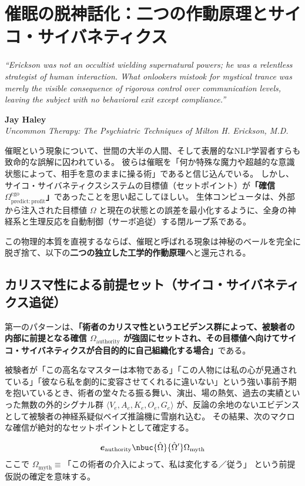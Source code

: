 \chapter{催眠の脱神話化：二つの作動原理とサイコ・サイバネティクス}
\epigraph{%
  \itshape ``Erickson was not an occultist wielding supernatural powers;
  he was a relentless strategist of human interaction.
  What onlookers mistook for mystical trance was merely the visible consequence
  of rigorous control over communication levels,
  leaving the subject with no behavioral exit except compliance.''
}{%
  \textbf{Jay Haley}\\
  \textit{Uncommon Therapy: The Psychiatric Techniques of Milton H. Erickson, M.D.}
}
催眠という現象について、世間の大半の人間、そして表層的なNLP学習者すらも致命的な誤解に囚われている。
彼らは催眠を「何か特殊な魔力や超越的な意識状態によって、相手を意のままに操る術」であると信じ込んでいる。
しかし、サイコ・サイバネティクスシステムの目標値（セットポイント）が\textbf{「確信 $\Omega^{\mathrm{ego}}_{\mathrm{predict:profit}}$」}であったことを思い起こしてほしい。
生体コンピュータは、外部から注入された目標値 $\Omega$ と現在の状態との誤差を最小化するように、全身の神経系と生理反応を自動制御（サーボ追従）する閉ループ系である。

この物理的本質を直視するならば、催眠と呼ばれる現象は神秘のベールを完全に脱ぎ捨て、以下の\textbf{二つの独立した工学的作動原理}へと還元される。

\section{カリスマ性による前提セット（サイコ・サイバネティクス追従）}

第一のパターンは、\textbf{「術者のカリスマ性というエビデンス群によって、被験者の内部に前提となる確信 $\Omega_{\mathrm{authority}}$ が強固にセットされ、その目標値へ向けてサイコ・サイバネティクスが合目的的に自己組織化する場合」}である。

被験者が「この高名なマスターは本物である」「この人物には私の心が見通されている」「彼なら私を劇的に変容させてくれるに違いない」という強い事前予期を抱いているとき、術者の堂々たる振る舞い、演出、場の熱気、過去の実績といった無数の外的シグナル群 $\langle V_e, A_e, K_e, O_e, G_e \rangle$ が、反論の余地のないエビデンスとして被験者の神経系疑似ベイズ推論機に雪崩れ込む。
その結果、次のマクロな確信が絶対的なセットポイントとして確定する。

\begin{equation}
    \boldsymbol{e}_{\mathrm{authority}} \nbuc{\hat{\Omega}}{\hat{\Omega}'} \Omega_{\mathrm{myth}}
\end{equation}
ここで $\Omega_{\mathrm{myth}} \equiv \text{「この術者の介入によって、私は変化する／従う」}$ という前提仮説の確定を意味する。

